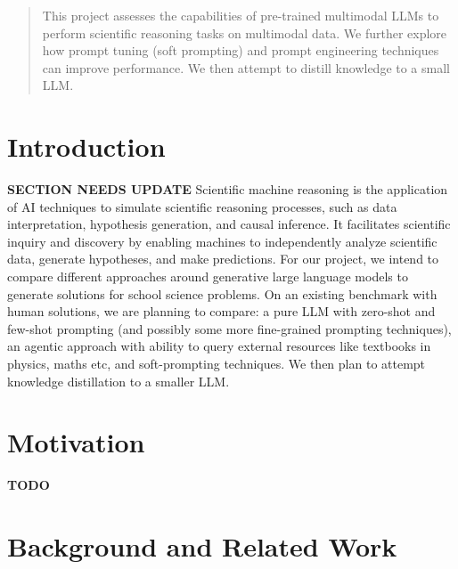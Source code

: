 \documentclass{article}
\begin{document}
\begin{abstract}
This project assesses the capabilities of pre-trained multimodal LLMs to perform scientific reasoning tasks on multimodal data. We further explore how prompt tuning (soft prompting) and prompt engineering techniques can improve performance. We then attempt to distill knowledge to a small LLM.
\end{abstract}
           


\section{Introduction}
\label{introduction}

\textbf{SECTION NEEDS UPDATE}
Scientific machine reasoning is the application of AI techniques to simulate scientific reasoning processes, such as  data interpretation, hypothesis generation, and causal inference. It facilitates scientific inquiry and discovery by enabling machines to independently analyze scientific data, generate hypotheses, and make predictions.
For our project, we intend to compare different approaches around generative large language models to generate solutions for school science problems. On an existing benchmark with human solutions, we are planning to compare: a pure LLM with zero-shot and few-shot prompting (and possibly some more fine-grained prompting techniques), an agentic approach with ability to query external resources like textbooks in physics, maths etc, and soft-prompting techniques. We then plan to attempt knowledge distillation to a smaller LLM. 

\section{Motivation}
\label{motivation}
\textbf{TODO}

\section{Background and Related Work}
\label{related-work}

\end{document}
